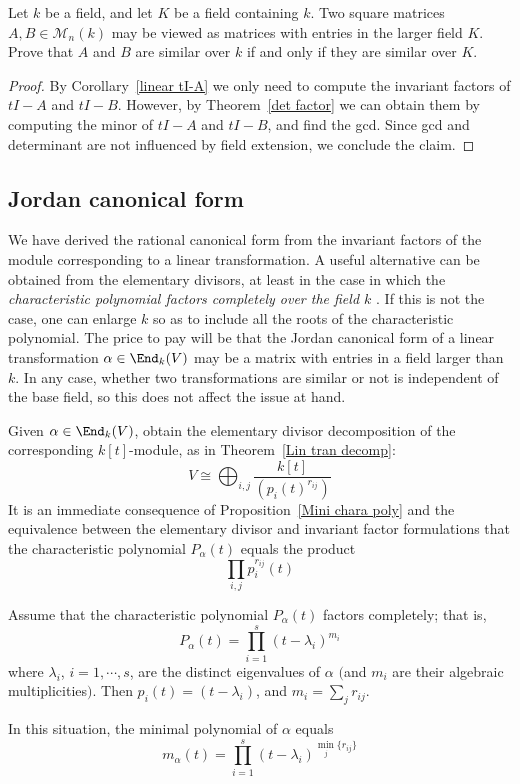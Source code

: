 \begin{corollary}
Let $k$ be a field, and let $K$ be a field containing $k$. Two square matrices $A,B\in\mathcal{M}_n(k)$ may be viewed as matrices with entries in the larger field $K$. Prove that $A$ and $B$ are similar over $k$ if and only if they are similar over $K$.
\end{corollary}
\begin{proof}
By Corollary~\ref{linear tI-A} we only need to compute the invariant factors of $tI-A$ and $tI-B$. However, by Theorem~\ref{det factor} we can obtain them by computing the minor of $tI-A$ and $tI-B$, and find the gcd. Since gcd and determinant are not influenced by field extension, we conclude the claim.
\end{proof}
\subsection{Jordan canonical form}
We have derived the rational canonical form from the invariant factors of the module corresponding to a linear transformation. A useful alternative can be obtained from the elementary divisors, at least in the case in which the \textit{characteristic polynomial factors completely over the field $k$} . If this is not the case, one can enlarge $k$ so as to include all the roots of the characteristic polynomial. The price to pay will be that the Jordan canonical form of a linear transformation $\alpha\in\End_k(V)$ may be a matrix with entries in a field larger than $k$. In any case, whether two transformations are similar or not is independent of the base field, so this does not affect the issue at hand.\par
Given $\alpha\in\End_k(V)$, obtain the elementary divisor decomposition of the corresponding
$k[t]$-module, as in Theorem~\ref{Lin tran decomp}:
\[V\cong\bigoplus_{i,j}\dfrac{k[t]}{(p_i(t)^{r_{ij}})}\]
It is an immediate consequence of Proposition~\ref{Mini chara poly} and the equivalence between
the elementary divisor and invariant factor formulations that the characteristic polynomial $P_\alpha(t)$ equals the product
\[\prod_{i,j}p_i^{r_{ij}}(t)\]
\begin{lemma}
Assume that the characteristic polynomial $P_\alpha(t)$ factors completely; that is,
\[P_\alpha(t)=\prod_{i=1}^{s}(t-\lambda_i)^{m_i}\]
where $\lambda_i$, $i=1,\cdots,s$, are the distinct eigenvalues of $\alpha$ $($and $m_i$ are their algebraic multiplicities$)$. Then $p_i(t)=(t-\lambda_i)$, and $m_i=\sum_{j}r_{ij}$.\par
In this situation, the minimal polynomial of $\alpha$ equals
\[m_\alpha(t)=\prod_{i=1}^{s}(t-\lambda_i)^{\min_j\{r_{ij}\}}\]
\end{lemma}
